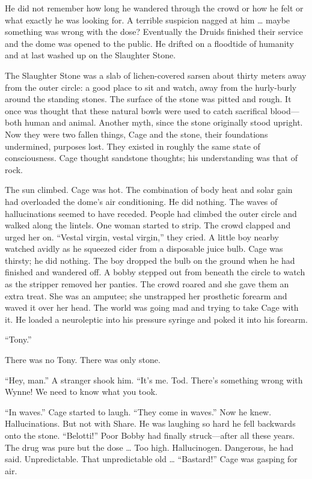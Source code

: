He did not remember how long he wandered through the crowd or how he felt or what exactly he was looking for. A terrible suspicion nagged at him … maybe something was wrong with the dose? Eventually the Druids finished their service and the dome was opened to the public. He drifted on a floodtide of humanity and at last washed up on the Slaughter Stone.

The Slaughter Stone was a slab of lichen-covered sarsen about thirty meters away from the outer circle: a good place to sit and watch, away from the hurly-burly around the standing stones. The surface of the stone was pitted and rough. It once was thought that these natural bowls were used to catch sacrifical blood—both human and animal. Another myth, since the stone originally stood upright. Now they were two fallen things, Cage and the stone, their foundations undermined, purposes lost. They existed in roughly the same state of consciousness. Cage thought sandstone thoughts; his understanding was that of rock.

The sun climbed. Cage was hot. The combination of body heat and solar gain had overloaded the dome’s air conditioning. He did nothing. The waves of hallucinations seemed to have receded. People had climbed the outer circle and walked along the lintels. One woman started to strip. The crowd clapped and urged her on. “Vestal virgin, vestal virgin,” they cried. A little boy nearby watched avidly as he squeezed cider from a disposable juice bulb. Cage was thirsty; he did nothing. The boy dropped the bulb on the ground when he had finished and wandered off. A bobby stepped out from beneath the circle to watch as the stripper removed her panties. The crowd roared and she gave them an extra treat. She was an amputee; she unstrapped her prosthetic forearm and waved it over her head. The world was going mad and trying to take Cage with it. He loaded a neuroleptic into his pressure syringe and poked it into his forearm.

“Tony.”

There was no Tony. There was only stone.

“Hey, man.” A stranger shook him. “It’s me. Tod. There’s something wrong with Wynne! We need to know what you took.

“In waves.” Cage started to laugh. “They come in waves.” Now he knew. Hallucinations. But not with Share. He was laughing so hard he fell backwards onto the stone. “Belotti!” Poor Bobby had finally struck—after all these years. The drug was pure but the dose … Too high. Hallucinogen. Dangerous, he had said. Unpredictable. That unpredictable old … “Bastard!” Cage was gasping for air.

